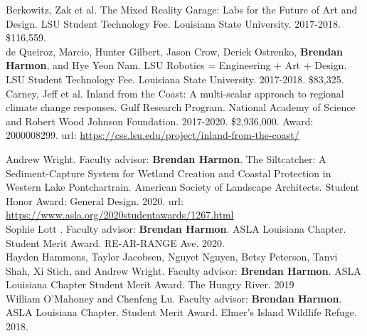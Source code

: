 \documentclass[10pt]{developercv} %
\begin{document}
Berkowitz, Zak et al. 
The Mixed Reality Garage: Labs for the Future of Art and Design. 
LSU Student Technology Fee. Louisiana State University. 
2017-2018. \$116,559.\\

de Queiroz, Marcio, Hunter Gilbert, Jason Crow, Derick Ostrenko, \textbf{Brendan Harmon}, and Hye Yeon Nam. 
LSU Robotics = Engineering + Art + Design. 
LSU Student Technology Fee. Louisiana State University. 
2017-2018. \$83,325.\\

Carney, Jeff et al. 
Inland from the Coast: A multi-scalar approach to regional climate change responses. 
Gulf Research Program. National Academy of Science and Robert Wood Johnson Foundation.
2017-2020. \$2,936,000. Award: 2000008299.
url: \url{https://css.lsu.edu/project/inland-from-the-coast/}\\






Andrew Wright. Faculty advisor: \textbf{Brendan Harmon}. The Siltcatcher: A Sediment-Capture System for Wetland Creation and Coastal Protection in Western Lake Pontchartrain. American Society of Landscape Architects. Student Honor Award: General Design. 2020. url: \url{https://www.asla.org/2020studentawards/1267.html}\\

Sophie Lott	. Faculty advisor: \textbf{Brendan Harmon}. ASLA Louisiana Chapter. Student Merit Award. RE-AR-RANGE Ave. 2020.	\\

Hayden Hammons, Taylor Jacobsen, Nguyet Nguyen, Betsy Peterson, Tanvi Shah, Xi Stich, and Andrew Wright. Faculty advisor: \textbf{Brendan Harmon}. ASLA Louisiana Chapter Student Merit Award. The Hungry River. 2019\\

William O'Mahoney and Chenfeng Lu. Faculty advisor: \textbf{Brendan Harmon}. ASLA Louisiana Chapter. Student Merit Award. Elmer’s Island Wildlife Refuge. 2018.\\
\end{document}
